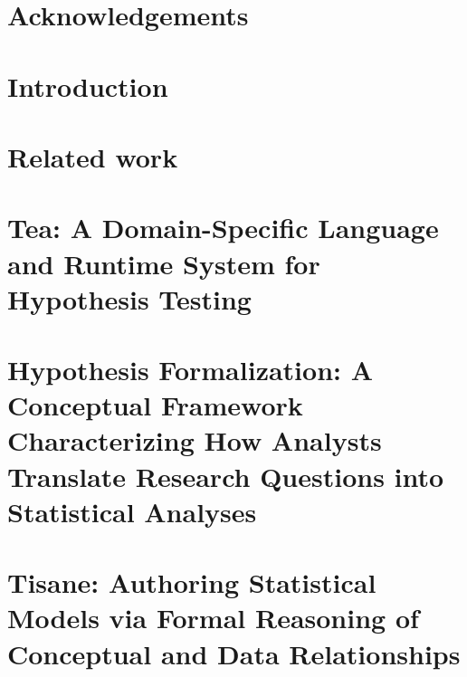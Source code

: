 \documentclass[11pt]{book}
\begin{document}
% 






{} %



\chapter*{Acknowledgements}



\tableofcontents{}
\listoffigures
\listoftables
\clearpage

\chapter {Introduction}


\chapter {Related work}
\label{chapter:relatedWork}


\chapter{Tea: A Domain-Specific Language and Runtime System for Hypothesis Testing} %
\label{chapter:tea}


\chapter{Hypothesis Formalization: A Conceptual Framework Characterizing How Analysts Translate Research Questions into Statistical Analyses} %
\label{chapter:hypoForm}


\chapter{Tisane: Authoring Statistical Models via Formal Reasoning of Conceptual and Data Relationships}
\label{chapter:tisane}


% 
\end{document}
